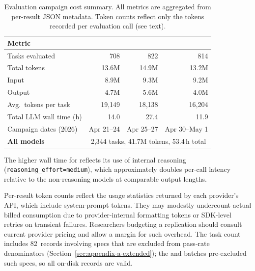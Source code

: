\begin{table}[h]
    \centering
    \caption{Evaluation campaign cost summary. All metrics are aggregated from per-result JSON metadata. Token counts reflect only the tokens recorded per evaluation call (see text).}
    \label{tab:eval-cost}
    \begin{tabular}{lrrr}
        \toprule
        \textbf{Metric} & \textbf{\qwenshort{}} & \textbf{\gptnew{}} & \textbf{\codex{}} \\
        \midrule
        Tasks evaluated & 708 & 822 & 814 \\
        Total tokens & 13.6M & 14.9M & 13.2M \\
        \quad Input & 8.9M & 9.3M & 9.2M \\
        \quad Output & 4.7M & 5.6M & 4.0M \\
        Avg.\ tokens per task & 19{,}149 & 18{,}138 & 16{,}204 \\
        Total LLM wall time (h) & 14.0 & 27.4 & 11.9 \\
        Campaign dates (2026) & Apr 21--24 & Apr 25--27 & Apr 30--May 1 \\
        \midrule
        \textbf{All models} & \multicolumn{3}{c}{2{,}344 tasks, 41.7M tokens, 53.4\,h total} \\
        \bottomrule
    \end{tabular}
\end{table}

The higher wall time for \gptnew{} reflects its use of internal
reasoning (\texttt{reasoning\_effort=medium}), which approximately doubles
per-call latency relative to the non-reasoning models at comparable output
lengths.

Per-result token counts reflect the usage statistics returned by each
provider's API, which include system-prompt tokens.
They may modestly undercount actual billed consumption due to
provider-internal formatting tokens or SDK-level retries on transient
failures. Researchers budgeting a replication should consult current
provider pricing and allow a margin for such overhead.
The \qwenshort{} task count includes 82~records involving \knownfail{}
specs that are excluded from pass-rate denominators
(Section~\ref{sec:appendix-a-extended}); the \gptnew{} and \codex{}
batches pre-excluded such specs, so all on-disk records are valid.


